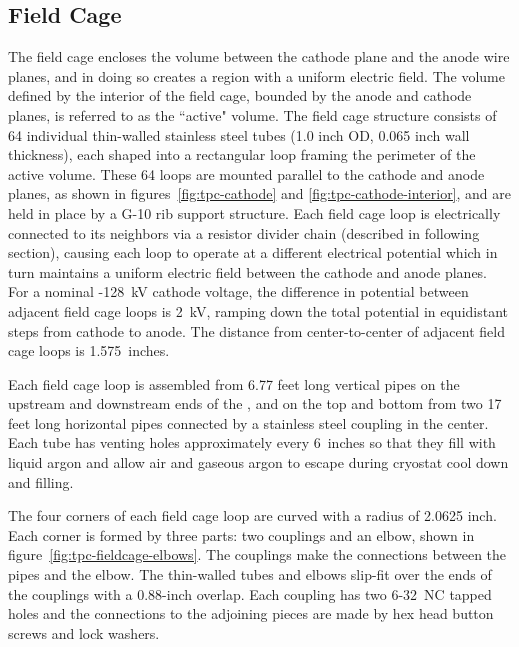 \subsection{Field Cage}
The field cage encloses the volume between the cathode plane and the anode wire planes, and in doing so creates a region with a uniform electric field.  The volume defined by the interior of the field cage, bounded by the anode and cathode planes, is referred to as the ``active" volume.   The field cage structure consists of 64 individual thin-walled stainless steel tubes (1.0 inch OD, 0.065 inch wall thickness), each shaped into a rectangular loop framing the perimeter of the active volume. These 64 loops are mounted parallel to the cathode and anode planes, as shown in figures~\ref{fig:tpc-cathode} and \ref{fig:tpc-cathode-interior}, and are held in place by a G-10 rib support structure. Each field cage loop is electrically connected to its neighbors via a resistor divider chain (described in following section), causing each loop to operate at a different electrical potential which in turn maintains a uniform electric field between the cathode and anode planes. For a nominal -128~kV cathode voltage, the difference in potential between adjacent field cage loops is 2~kV, ramping down the total potential in equidistant steps from cathode to anode. The distance from center-to-center of adjacent field cage loops is 1.575~inches.

Each field cage loop is assembled from 6.77 feet long vertical pipes on the upstream and downstream ends of the \lartpc, and on the top and bottom from two 17 feet long horizontal pipes connected by a stainless steel coupling in the center.  Each tube has venting holes approximately every 6~inches so that they fill with liquid argon and allow air and gaseous argon to escape during cryostat cool down and filling.

The four corners of each field cage loop are curved with a radius of 2.0625 inch. Each corner is formed by three parts: two couplings and an elbow, shown in figure~\ref{fig:tpc-fieldcage-elbows}. The couplings make the connections between the pipes and the elbow. The thin-walled tubes and elbows slip-fit over the ends of the couplings with a 0.88-inch overlap. Each coupling has two 6-32~NC tapped holes and the connections to the adjoining pieces are made by hex head button screws and lock washers.

